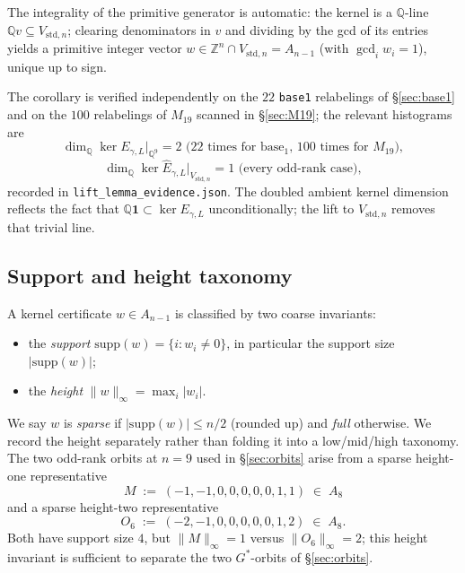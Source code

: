 \documentclass[11pt,a4paper]{article}
\theoremstyle{definition}
\theoremstyle{remark}
\providecommand{\one}{\mathbf{1}}
\providecommand{\Z}{\mathbb{Z}}
\providecommand{\Q}{\mathbb{Q}}
\newcommand{\Vstdn}{V_{\mathrm{std},n}}
\newcommand{\Egamma}{E_{\gamma,L}}
\newcommand{\Ehat}{\widehat{E}_{\gamma,L}}
\begin{document}
The integrality of the primitive generator is automatic: the kernel
is a $\Q$-line $\Q v \subseteq \Vstdn$; clearing denominators in $v$
and dividing by the gcd of its entries yields a primitive integer
vector $w \in \Z^n \cap \Vstdn = A_{n-1}$ (with $\gcd_i w_i = 1$),
unique up to sign.

The corollary is verified independently on the $22$ \texttt{base1}
relabelings of \S\ref{sec:base1} and on the $100$ relabelings of
$M_{19}$ scanned in \S\ref{sec:M19}; the relevant histograms are
\begin{equation*}
   \dim_\Q \ker \Egamma|_{\Q^9} = 2 \text{ (}22\text{ times for base$_1$, }100\text{ times for }M_{19}\text{)},
\end{equation*}
\begin{equation*}
   \dim_\Q \ker \Ehat|_{\Vstdn} = 1 \text{ (every odd-rank case)},
\end{equation*}
recorded in \texttt{lift\_lemma\_evidence.json}. The doubled
ambient kernel dimension reflects the fact that $\Q\one \subset
\ker \Egamma$ unconditionally; the lift to $\Vstdn$ removes that
trivial line.

\subsection{Support and height taxonomy}\label{sec:cert-taxonomy}

A kernel certificate $w \in A_{n-1}$ is classified by two coarse
invariants:
\begin{itemize}[leftmargin=*]
   \item the \emph{support} $\mathrm{supp}(w) = \{i : w_i \neq 0\}$,
   in particular the support size $|\mathrm{supp}(w)|$;
   \item the \emph{height} $\|w\|_\infty = \max_i |w_i|$.
\end{itemize}
We say $w$ is \emph{sparse} if $|\mathrm{supp}(w)| \le n/2$ (rounded
up) and \emph{full} otherwise. We record the height separately rather
than folding it into a low/mid/high taxonomy. The two odd-rank orbits
at $n = 9$ used in \S\ref{sec:orbits} arise from a sparse height-one
representative
\begin{equation*}
   M \;:=\; (-1, -1, 0, 0, 0, 0, 0, 1, 1) \;\in\; A_8
\end{equation*}
and a sparse height-two representative
\begin{equation*}
   O_6 \;:=\; (-2, -1, 0, 0, 0, 0, 0, 1, 2) \;\in\; A_8.
\end{equation*}
Both have support size $4$, but $\|M\|_\infty = 1$ versus
$\|O_6\|_\infty = 2$; this height invariant is sufficient to separate
the two $G^*$-orbits of \S\ref{sec:orbits}.
\end{document}
